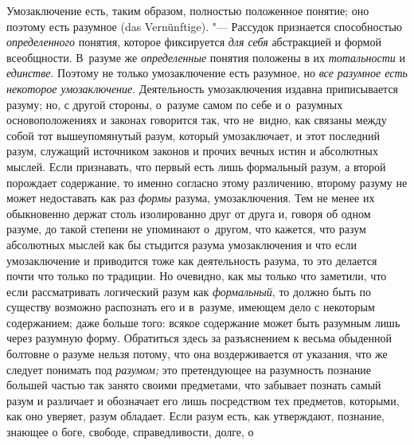 Умозаключение есть, таким образом, полностью положенное понятие; оно поэтому
есть разумное (das Vernünftige). "--- Рассудок признается способностью
{\em определенного} понятия, которое фиксируется {\em для себя} абстракцией
и формой всеобщности. В~разуме же {\em определенные} понятия положены в их
{\em тотальности} и {\em единстве}. Поэтому не только умозаключение есть
разумное, но {\em все разумное есть некоторое умозаключение}. Деятельность
умозаключения издавна приписывается разуму; но, с другой стороны, о~разуме
самом по себе и о~разумных основоположениях и законах говорится так, что
не~видно, как связаны между собой тот вышеупомянутый разум, который
умозаключает, и этот последний разум, служащий источником законов и прочих
вечных истин и абсолютных мыслей. Если признавать, что первый есть лишь
формальный разум, а второй порождает содержание, то именно согласно этому
различению, второму разуму не может недоставать как раз {\em формы} разума,
умозаключения. Тем не менее их обыкновенно держат столь изолированно друг
от друга и, говоря об одном разуме, до такой степени не упоминают
о~другом, что кажется, что разум абсолютных мыслей как бы
стыдится разума умозаключения и что если умозаключение и приводится тоже
как деятельность разума, то это делается почти что только по традиции. Но
очевидно, как мы только что заметили, что если рассматривать логический разум
как {\em формальный}, то должно быть по существу возможно распознать его и
в~разуме, имеющем дело с некоторым содержанием; даже больше того: всякое
содержание может быть разумным лишь через разумную форму. Обратиться здесь
за разъяснением к весьма обыденной болтовне о разуме нельзя потому, что она
воздерживается от указания, что же следует понимать под {\em разумом;} это
претендующее на разумность познание
большей частью так занято своими предметами, что забывает
познать самый разум и различает и обозначает его лишь посредством тех
предметов, которыми, как оно уверяет, разум обладает. Если разум есть, как
утверждают, познание, знающее о боге, свободе, справедливости, долге, о
